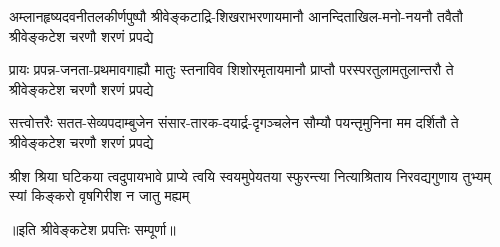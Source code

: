 \begin{AutoCols}[\maxColumns]
\fourlineindentedshloka
{अम्लानहृष्यदवनीतलकीर्णपुष्पौ}
{श्रीवेङ्कटाद्रि-शिखराभरणायमानौ}
{आनन्दिताखिल-मनो-नयनौ तवैतौ}
{श्रीवेङ्कटेश चरणौ शरणं प्रपद्ये}

\fourlineindentedshloka
{प्रायः प्रपन्न-जनता-प्रथमावगाह्यौ}
{मातुः स्तनाविव शिशोरमृतायमानौ}
{प्राप्तौ परस्परतुलामतुलान्तरौ ते}
{श्रीवेङ्कटेश चरणौ शरणं प्रपद्ये}

\fourlineindentedshloka
{सत्त्वोत्तरैः सतत-सेव्यपदाम्बुजेन}
{संसार-तारक-दयार्द्र-दृगञ्चलेन}
{सौम्यौ पयन्तृमुनिना मम दर्शितौ ते}
{श्रीवेङ्कटेश चरणौ शरणं प्रपद्ये}

\fourlineindentedshloka
{श्रीश श्रिया घटिकया त्वदुपायभावे}
{प्राप्ये त्वयि स्वयमुपेयतया स्फुरन्त्या}
{नित्याश्रिताय निरवद्यगुणाय तुभ्यम्}
{स्यां किङ्करो वृषगिरीश न जातु मह्यम्}

॥इति श्रीवेङ्कटेश प्रपत्तिः सम्पूर्णा॥

\end{AutoCols}

